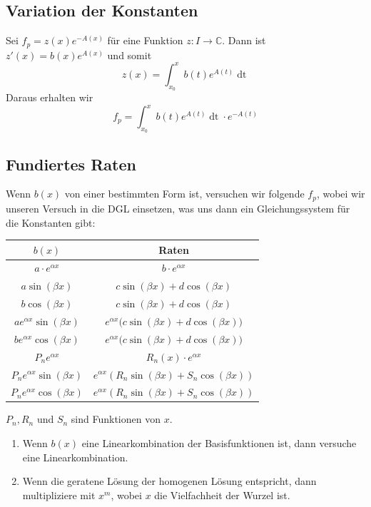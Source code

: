 \documentclass[a4paper,10pt]{article}
\def\C{\mathbb{C}}
\begin{document}
\subsection{Variation der Konstanten}
Sei \(f_p = z(x)e^{-A(x)}\) für eine Funktion \(z: I \to \C\). Dann ist \(z'(x) = b(x) e^{A(x)}\) und somit \[z(x) = \int_{x_0}^x b(t) e^{A(t)} \mathop{dt}\] Daraus erhalten wir \[f_p = \int_{x_0}^x b(t) e^{A(t)} \mathop{dt} \cdot e^{-A(t)}\]

\subsection{Fundiertes Raten}

Wenn $b(x)$ von einer bestimmten Form ist, versuchen wir folgende $f_p$, wobei wir unseren Versuch in die DGL einsetzen, was uns dann ein Gleichungssystem für die Konstanten gibt:

\begin{center}
  \renewcommand*{\arraystretch}{1.6}
  \begin{tabular}{cc} 
    \toprule
    $b(x)$ & Raten \\ 
    \midrule
    $a \cdot e^{\alpha x}$ & $b \cdot e^{\alpha x}$\\
    $a \sin(\beta x)$ & $c \sin(\beta x) + d \cos(\beta x)$\\
    $b \cos(\beta x)$ & $c \sin(\beta x) + d \cos(\beta x)$\\
    $a e^{\alpha x} \sin(\beta x)$ & $e^{\alpha x} \Big( c \sin(\beta x) + d \cos(\beta x) \Big)$\\
    $b e^{\alpha x} \cos(\beta x)$ & $e^{\alpha x} \Big( c \sin(\beta x) + d \cos(\beta x) \Big)$\\
    $P_n e^{\alpha x}$ & $R_n(x) \cdot e^{\alpha x}$\\
    $P_n e^{\alpha x} \sin(\beta x)$ & $e^{\alpha x} \left( R_n \sin(\beta x) + S_n \cos(\beta x) \right)$\\
    $P_n e^{\alpha x} \cos(\beta x)$ & $e^{\alpha x} \left( R_n \sin(\beta x) + S_n \cos(\beta x) \right)$\\
    \bottomrule
  \end{tabular}
\end{center}

\(P_n, R_n \) und \(S_n\) sind Funktionen von \(x\). 

\begin{enumerate}
  \item Wenn \(b(x)\) eine Linearkombination der Basisfunktionen ist, dann versuche eine Linearkombination.
  \item Wenn die geratene Lösung der homogenen Lösung entspricht, dann multipliziere mit \(x^m\), wobei \(x\) die Vielfachheit der Wurzel ist.
\end{enumerate}
\end{document}
